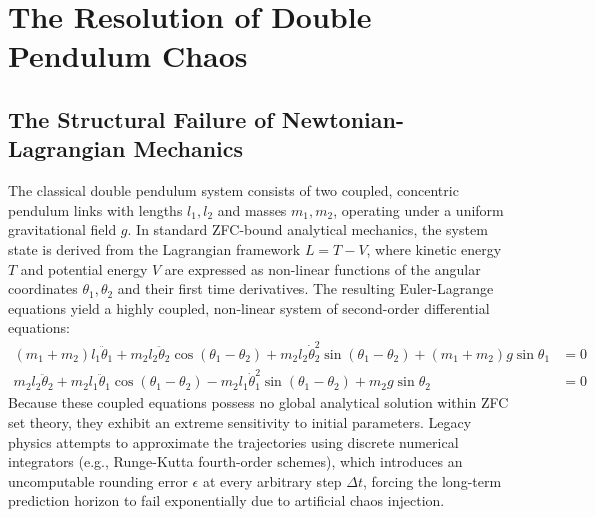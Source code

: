 \documentclass[11pt,a4paper]{article}
\begin{document}
\section{The Resolution of Double Pendulum Chaos}

\subsection{The Structural Failure of Newtonian-Lagrangian Mechanics}
The classical double pendulum system consists of two coupled, concentric pendulum links with lengths $l_1, l_2$ and masses $m_1, m_2$, operating under a uniform gravitational field $g$. In standard ZFC-bound analytical mechanics, the system state is derived from the Lagrangian framework $L = T - V$, where kinetic energy $T$ and potential energy $V$ are expressed as non-linear functions of the angular coordinates $\theta_1, \theta_2$ and their first time derivatives. The resulting Euler-Lagrange equations yield a highly coupled, non-linear system of second-order differential equations:
\begin{align}
    (m_1+m_2)l_1\ddot{\theta}_1 + m_2l_2\ddot{\theta}_2\cos(\theta_1-\theta_2) + m_2l_2\dot{\theta}_2^2\sin(\theta_1-\theta_2) + (m_1+m_2)g\sin\theta_1 &= 0 \\
    m_2l_2\ddot{\theta}_2 + m_2l_1\ddot{\theta}_1\cos(\theta_1-\theta_2) - m_2l_1\dot{\theta}_1^2\sin(\theta_1-\theta_2) + m_2g\sin\theta_2 &= 0
\end{align}
Because these coupled equations possess no global analytical solution within ZFC set theory, they exhibit an extreme sensitivity to initial parameters. Legacy physics attempts to approximate the trajectories using discrete numerical integrators (e.g., Runge-Kutta fourth-order schemes), which introduces an uncomputable rounding error $\epsilon$ at every arbitrary step $\Delta t$, forcing the long-term prediction horizon to fail exponentially due to artificial chaos injection.
\end{document}
